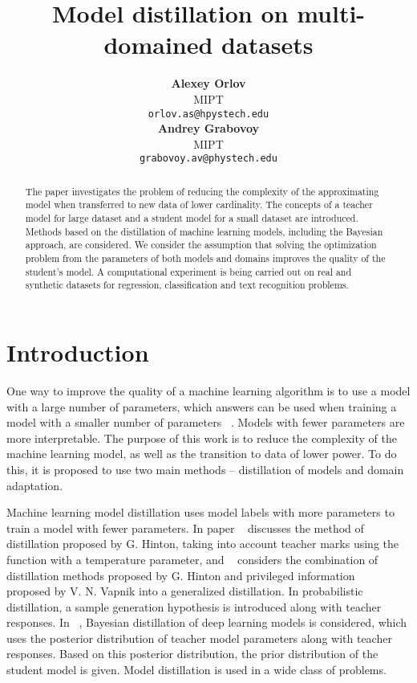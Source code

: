 \documentclass[12pt]{article}
\title{Model distillation on multi-domained datasets}
\author{ \textbf{Alexey Orlov}\\
	MIPT\\
        \texttt{orlov.as@hpystech.edu}\\
	\And
	\textbf{Andrey Grabovoy} \\
	MIPT\\
        \texttt{grabovoy.av@phystech.edu}\\
}
\date{}
\begin{document}
\maketitle

\begin{abstract}
	The paper investigates the problem of reducing the complexity of the approximating model when transferred to new data of lower cardinality. The concepts of a teacher model for large dataset and a student model for a small dataset are introduced. Methods based on the distillation of machine learning models, including the Bayesian approach, are considered. We consider the assumption that solving the optimization problem from the parameters of both models and domains improves the quality of the student's model. A computational experiment is being carried out on real and synthetic datasets for regression, classification and text recognition problems.
\end{abstract}




\section{Introduction}

One way to improve the quality of a machine learning algorithm is to use a model with a large number of parameters, which answers can be used when training a model with a smaller number of parameters ~\cite{Hinton2015}. Models with fewer parameters are more interpretable. The purpose of this work is to reduce the complexity of the machine learning model, as well as the transition to data of lower power. To do this, it is proposed to use two main methods -- distillation of models and domain adaptation.



Machine learning model distillation uses model labels with more parameters to train a model with fewer parameters. In paper ~\cite{Hinton2015} discusses the method of distillation proposed by G. Hinton, taking into account teacher marks using the function  with a temperature parameter, and ~\cite{Vapnik2016} considers the combination of distillation methods proposed by G. Hinton and privileged information ~\cite{Vapnik2016} proposed by V. N. Vapnik into a generalized distillation. In probabilistic distillation, a sample generation hypothesis is introduced along with teacher responses. In ~\cite{Grabovoy2021}, Bayesian distillation of deep learning models is considered, which uses the posterior distribution of teacher model parameters along with teacher responses. Based on this posterior distribution, the prior distribution of the student model is given. Model distillation is used in a wide class of problems. 
\end{document}
